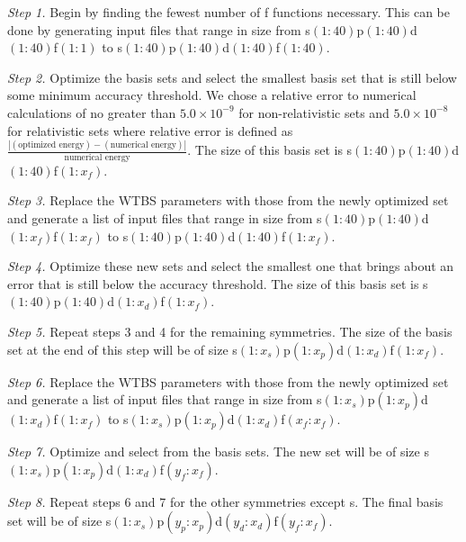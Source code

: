 \textit{Step 1.} Begin by finding the fewest number of f functions necessary. This can be done by generating input files that range in size from s$(1:40)$p$(1:40)$d$(1:40)$f$(1:1)$ to s$(1:40)$p$(1:40)$d$(1:40)$f$(1:40)$.

\textit{Step 2.} Optimize the basis sets and select the smallest basis set that is still below some minimum accuracy threshold. We chose a relative error to numerical calculations of no greater than $5.0\times10^{-9}$ for non-relativistic sets and $5.0\times10^{-8}$ for relativistic sets where relative error is defined as $\frac{|(\text{optimized energy}) - (\text{numerical energy})|}{\text{numerical energy}}$. The size of this basis set is s$(1:40)$p$(1:40)$d$(1:40)$f$(1:x_{f})$.

\textit{Step 3.} Replace the WTBS parameters with those from the newly optimized set and generate a list of input files that range in size from s$(1:40)$p$(1:40)$d$(1:x_{f})$f$(1:x_{f})$ to s$(1:40)$p$(1:40)$d$(1:40)$f$(1:x_{f})$.

\textit{Step 4.} Optimize these new sets and select the smallest one that brings about an error that is still below the accuracy threshold. The size of this basis set is s$(1:40)$p$(1:40)$d$(1:x_{d})$f$(1:x_{f})$.

\textit{Step 5.} Repeat steps 3 and 4 for the remaining symmetries. The size of the basis set at the end of this step will be of size s$(1:x_{s})$p$(1:x_{p})$d$(1:x_{d})$f$(1:x_{f})$.

\textit{Step 6.} Replace the WTBS parameters with those from the newly optimized set and generate a list of input files that range in size from s$(1:x_{s})$p$(1:x_{p})$d$(1:x_{d})$f$(1:x_{f})$ to s$(1:x_{s})$p$(1:x_{p})$d$(1:x_{d})$f$(x_{f}:x_{f})$.

\textit{Step 7.} Optimize and select from the basis sets. The new set will be of size s$(1:x_{s})$p$(1:x_{p})$d$(1:x_{d})$f$(y_{f}:x_{f})$.

\textit{Step 8.} Repeat steps 6 and 7 for the other symmetries except s. The final basis set will be of size s$(1:x_{s})$p$(y_{p}:x_{p})$d$(y_{d}:x_{d})$f$(y_{f}:x_{f})$.

